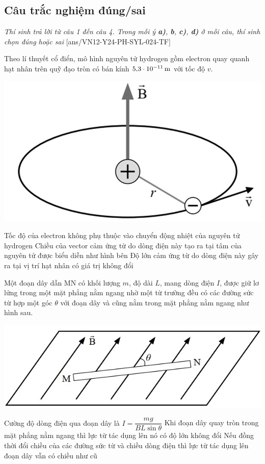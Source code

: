 \subsection{Câu trắc nghiệm đúng/sai}
\textit{Thí sinh trả lời từ câu 1 đến câu 4. Trong mỗi ý \textbf{a)}, \textbf{b}, \textbf{c)}, \textbf{d)} ở mỗi câu, thí sinh chọn đúng hoặc sai}
\setcounter{ex}{0}
[ans/VN12-Y24-PH-SYL-024-TF]
\begin{ex}
	Theo lí thuyết cổ điển, mô hình nguyên tử hydrogen gồm electron quay quanh hạt nhân trên quỹ đạo tròn có bán kính $\SI{5.3E-11}{\meter}$ với tốc độ $v$.	
	\begin{center}
		\includegraphics[width=0.3\linewidth]{figs/VN12-Y24-PH-SYL-025P-10}
	\end{center}
	{\True Tốc độ của electron không phụ thuộc vào chuyển động nhiệt của nguyên tử hydrogen}
	{Chiều của vector cảm ứng từ do dòng điện này tạo ra tại tâm của nguyên tử được biểu diễn như hình bên}
	{\True Độ lớn cảm ứng từ do dòng điện này gây ra tại vị trí hạt nhân có giá trị không đổi}
	\loigiai{}
\end{ex}
\begin{ex}
	Một đoạn dây dẫn MN có khối lượng $m$, độ dài $L$, mang dòng điện $I$, được giữ lơ lửng trong một mặt phẳng nằm ngang nhờ một từ trường đều có các đường sức từ hợp một góc $\theta$ với đoạn dây và cũng nằm trong mặt phẳng nằm ngang như hình sau.
	\begin{center}
		\includegraphics[width=0.4\linewidth]{figs/VN12-Y24-PH-SYL-025P-11}
	\end{center}	
	{\True Cường độ dòng điện qua đoạn dây là $I=\dfrac{m g}{B L \sin \theta}$}
	{Khi đoạn dây quay tròn trong mặt phẳng nằm ngang thì lực từ tác dụng lên nó có độ lớn không đổi}
	{\True Nếu đồng thời đổi chiều của các đường sức từ và chiều dòng điện thì lực từ tác dụng lên đoạn dây vẫn có chiều như cũ}
	\loigiai{}
\end{ex}
